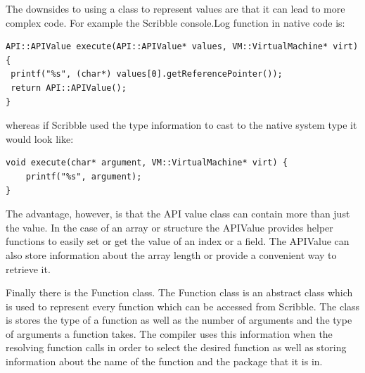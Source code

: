 \documentclass[]{final_report}
\begin{document}
The downsides to using a class to represent values are that it can lead to more complex code. For example the Scribble console.Log function in native code is:

\begin{verbatim}
API::APIValue execute(API::APIValue* values, VM::VirtualMachine* virt) {
 printf("%s", (char*) values[0].getReferencePointer());
 return API::APIValue();
}
\end{verbatim}

whereas if Scribble used the type information to cast to the native system type it would look like:

\begin{verbatim}
void execute(char* argument, VM::VirtualMachine* virt) {
	printf("%s", argument);
}
\end{verbatim}

The advantage, however, is that the API value class can contain more than just the value. In the case of an array or structure the APIValue provides helper functions to easily set or get the value of an index or a field. The APIValue can also store information about the array length or provide a convenient way to retrieve it.

Finally there is the Function class. The Function class is an abstract class which is used to represent every function which can be accessed from Scribble. The class is stores the type of a function as well as the number of arguments and the type of arguments a function takes. The compiler uses this information when the resolving function calls in order to select the desired function as well as storing information about the name of the function and the package that it is in.
\end{document}
